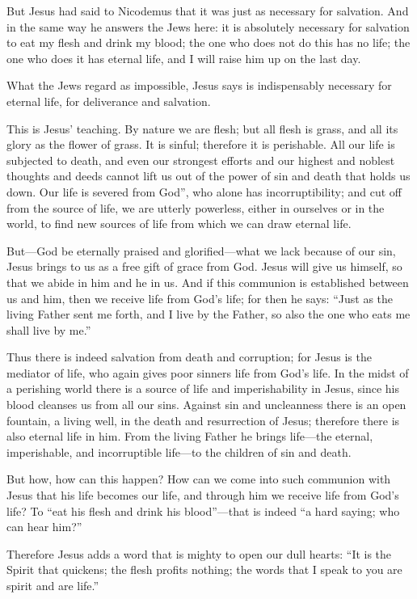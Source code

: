 But Jesus had said to Nicodemus that it was just as necessary for salvation. And in the same way he answers the Jews here: it is absolutely necessary for salvation to eat my flesh and drink my blood; the one who does not do this has no life; the one who does it has eternal life, and I will raise him up on the last day.

What the Jews regard as impossible, Jesus says is indispensably necessary for eternal life, for deliverance and salvation.

This is Jesus’ teaching. By nature we are flesh; but all flesh is grass, and all its glory as the flower of grass. It is sinful; therefore it is perishable. All our life is subjected to death, and even our strongest efforts and our highest and noblest thoughts and deeds cannot lift us out of the power of sin and death that holds us down. Our life is severed from God”, who alone has incorruptibility; and cut off from the source of life, we are utterly powerless, either in ourselves or in the world, to find new sources of life from which we can draw eternal life.

But—God be eternally praised and glorified—what we lack because of our sin, Jesus brings to us as a free gift of grace from God. Jesus will give us himself, so that we abide in him and he in us. And if this communion is established between us and him, then we receive life from God’s life; for then he says: “Just as the living Father sent me forth, and I live by the Father, so also the one who eats me shall live by me.”

Thus there is indeed salvation from death and corruption; for Jesus is the mediator of life, who again gives poor sinners life from God’s life. In the midst of a perishing world there is a source of life and imperishability in Jesus, since his blood cleanses us from all our sins. Against sin and uncleanness there is an open fountain, a living well, in the death and resurrection of Jesus; therefore there is also eternal life in him. From the living Father he brings life—the eternal, imperishable, and incorruptible life—to the children of sin and death.

But how, how can this happen? How can we come into such communion with Jesus that his life becomes our life, and through him we receive life from God’s life? To “eat his flesh and drink his blood”—that is indeed “a hard saying; who can hear him?”

Therefore Jesus adds a word that is mighty to open our dull hearts: “It is the Spirit that quickens; the flesh profits nothing; the words that I speak to you are spirit and are life.”


